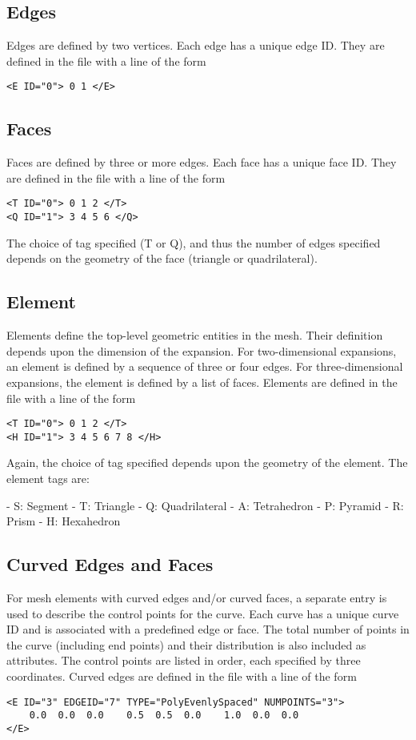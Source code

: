 \subsection{Edges}

Edges are defined by two vertices. Each edge has a unique edge ID. They are defined in the file with a line of the form
\begin{lstlisting}[style=XMLStyle]
<E ID="0"> 0 1 </E>
\end{lstlisting}

\subsection{Faces}

Faces are defined by three or more edges. Each face has a unique face ID. They are defined in the file with a line of the form
\begin{lstlisting}[style=XMLStyle]
<T ID="0"> 0 1 2 </T>
<Q ID="1"> 3 4 5 6 </Q>
\end{lstlisting}

The choice of tag specified (T or Q), and thus the number of edges specified depends on the geometry of the face (triangle or quadrilateral).

\subsection{Element}

Elements define the top-level geometric entities in the mesh. Their definition depends upon the dimension of the expansion. For two-dimensional expansions, an element is defined by a sequence of three or four edges. For three-dimensional expansions, the element is defined by a list of faces. Elements are defined in the file with a line of the form
\begin{lstlisting}[style=XMLStyle]
<T ID="0"> 0 1 2 </T>
<H ID="1"> 3 4 5 6 7 8 </H>
\end{lstlisting}
Again, the choice of tag specified depends upon the geometry of the element. The element tags are:

- S: Segment
- T: Triangle
- Q: Quadrilateral
- A: Tetrahedron
- P: Pyramid
- R: Prism
- H: Hexahedron

\subsection{Curved Edges and Faces}

For mesh elements with curved edges and/or curved faces, a separate entry is used to describe the control points for the curve. Each curve has a unique curve ID and is associated with a predefined edge or face. The total number of points in the curve (including end points) and their distribution is also included as attributes. The control points are listed in order, each specified by three coordinates. Curved edges are defined in the file with a line of the form
\begin{lstlisting}[style=XMLStyle]
<E ID="3" EDGEID="7" TYPE="PolyEvenlySpaced" NUMPOINTS="3">
    0.0  0.0  0.0    0.5  0.5  0.0    1.0  0.0  0.0
</E>
\end{lstlisting}


